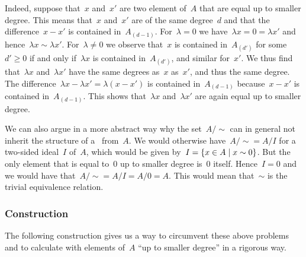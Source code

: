 \begin{fluff}
\begin{itemize}
			Indeed, suppose that~$x$ and~$x'$ are two element of~$A$ that are equal up to smaller degree.
			This means that~$x$ and~$x'$ are of the same degree~$d$ and that the difference~$x - x'$ is contained in~$A_{(d-1)}$.
			For~$\lambda = 0$ we have~$\lambda x = 0 = \lambda x'$ and hence~$\lambda x \sim \lambda x'$.
			For~$\lambda \neq 0$ we observe that~$x$ is contained in~$A_{(d')}$ for some~$d' \geq 0$ if and only if~$\lambda x$ is contained in~$A_{(d')}$, and similar for~$x'$.
			We thus find that~$\lambda x$ and~$\lambda x'$ have the same degrees as~$x$ as~$x'$, and thus the same degree.
			The difference~$\lambda x - \lambda x' = \lambda (x - x')$ is contained in~$A_{(d-1)}$ because~$x - x'$ is contained in~$A_{(d-1)}$.
			This shows that~$\lambda x$ and~$\lambda x'$ are again equal up to smaller degree.
	\end{itemize}

	We can also argue in a more abstract way why the set~$A / {\sim}$ can in general not inherit the structure of a~\algebra{$\kf$} from~$A$.
	We would otherwise have~$A/{\sim} = A/I$ for a two-sided ideal~$I$ of~$A$, which would be given by~$I = \{x \in A \suchthat x \sim 0\}$.
	But the only element that is equal to~$0$ up to smaller degree is~$0$ itself.
	Hence~$I = 0$ and we would have that~$A/{\sim} = A / I = A / 0 = A$.
	This would mean that~$\sim$ is the trivial equivalence relation.
\end{fluff}


\subsubsection{Construction}


\begin{fluff}
	The following construction gives us a way to circumvent these above problems and to calculate with elements of~$A$ \enquote{up to smaller degree} in a rigorous way.
\end{fluff}


